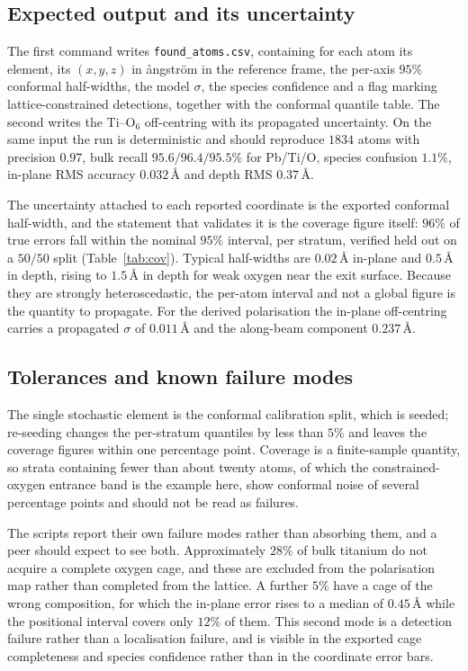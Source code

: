 \documentclass[aps,prb,twocolumn,superscriptaddress,floatfix,nofootinbib]{revtex4-2}
\begin{document}
\subsection{Expected output and its uncertainty}

The first command writes \texttt{found\_atoms.csv}, containing for each atom its element, its
$(x,y,z)$ in \aa{}ngstr\"om in the reference frame, the per-axis $95\%$ conformal half-widths,
the model $\sigma$, the species confidence and a flag marking lattice-constrained detections,
together with the conformal quantile table. The second writes the Ti--O$_6$ off-centring with
its propagated uncertainty. On the same input the run is deterministic and should reproduce
$1834$ atoms with precision $0.97$, bulk recall $95.6/96.4/95.5\%$ for Pb/Ti/O, species confusion
$1.1\%$, in-plane RMS accuracy $0.032$\,\AA{} and depth RMS $0.37$\,\AA.

The uncertainty attached to each reported coordinate is the exported conformal half-width, and
the statement that validates it is the coverage figure itself: $96\%$ of true errors fall within
the nominal $95\%$ interval, per stratum, verified held out on a $50/50$ split
(Table~\ref{tab:cov}). Typical half-widths are $0.02$\,\AA{} in-plane and $0.5$\,\AA{} in depth,
rising to $1.5$\,\AA{} in depth for weak oxygen near the exit surface. Because they are strongly
heteroscedastic, the per-atom interval and not a global figure is the quantity to propagate. For
the derived polarisation the in-plane off-centring carries a propagated $\sigma$ of
$0.011$\,\AA{} and the along-beam component $0.237$\,\AA.

\subsection{Tolerances and known failure modes}

The single stochastic element is the conformal calibration split, which is seeded; re-seeding
changes the per-stratum quantiles by less than $5\%$ and leaves the coverage figures within one
percentage point. Coverage is a finite-sample quantity, so strata containing fewer than about
twenty atoms, of which the constrained-oxygen entrance band is the example here, show
conformal noise of several percentage points and should not be read as failures.

The scripts report their own failure modes rather than absorbing them, and a peer should expect
to see both. Approximately $28\%$ of bulk titanium do not acquire a complete oxygen cage, and
these are excluded from the polarisation map rather than completed from the lattice. A further
$5\%$ have a cage of the wrong composition, for which the in-plane error rises to a median of
$0.45$\,\AA{} while the positional interval covers only $12\%$ of them. This second mode is a
detection failure rather than a localisation failure, and is visible in the exported cage
completeness and species confidence rather than in the coordinate error bars.
\end{document}
